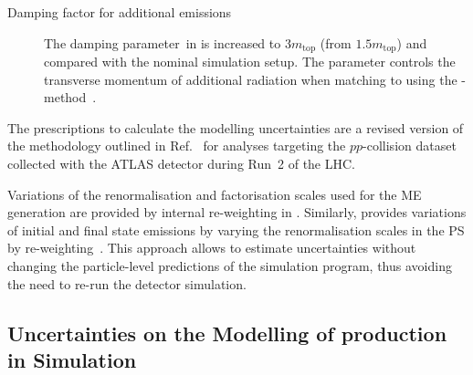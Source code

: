 \begin{description}
\item[Damping factor for additional emissions] The damping parameter~\hdamp in
  \POWHEGBOX[v2] is increased to $3 m_\text{top}$ (from $1.5 m_\text{top}$) and
  compared with the nominal simulation setup. The \hdamp parameter controls the
  transverse momentum of additional radiation when matching \POWHEGBOX[v2] to
  \PYTHIA[8] using the
  \POWHEG-method~\cite{ATL-PHYS-PUB-2016-020,ATL-PHYS-PUB-2020-023}.

\end{description}
The prescriptions to calculate the \ttbar modelling uncertainties are a revised
version of the methodology outlined in Ref.~\cite{ATL-PHYS-PUB-2020-023} for
analyses targeting the $pp$-collision dataset collected with the ATLAS detector
during Run~2 of the LHC.


Variations of the renormalisation and factorisation scales used for the ME
generation are provided by internal re-weighting in \POWHEGBOX[v2]. Similarly,
\PYTHIA[8] provides variations of initial and final state emissions by varying
the renormalisation scales in the PS by
re-weighting~\cite{Mrenna:2016sih,pythia-variations-online}. This approach
allows to estimate uncertainties without changing the particle-level predictions
of the simulation program, thus avoiding the need to re-run the detector
simulation.


\subsection{Uncertainties on the Modelling of \Zjets production in Simulation}%
\label{app:zjets_uncertainties}

